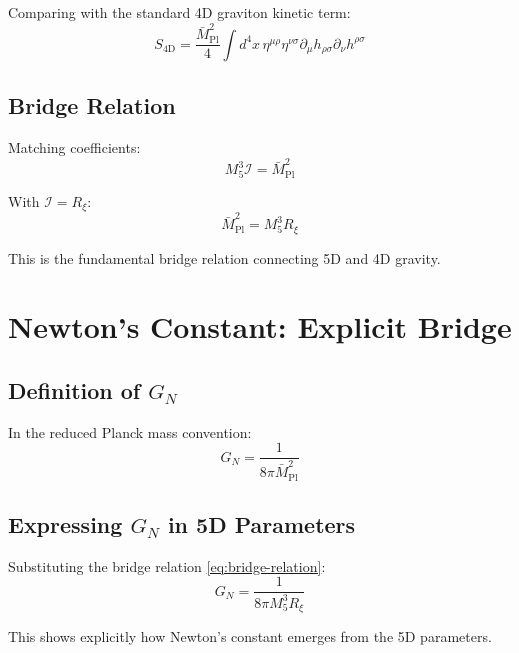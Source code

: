 \documentclass[11pt,a4paper]{article}
\newcommand{\Rxi}{R_\xi}
\newcommand{\Mplbar}{\bar{M}_{\mathrm{Pl}}}
\newcommand{\Mfive}{M_5}
\newcommand{\calI}{\mathcal{I}}
\newcommand{\GN}{G_N}
\begin{document}
Comparing with the standard 4D graviton kinetic term:
\begin{equation}
S_{\mathrm{4D}} = \frac{\Mplbar^2}{4} \int d^4x\, \eta^{\mu\rho}\eta^{\nu\sigma}
\partial_\mu h_{\rho\sigma} \partial_\nu h^{\rho\sigma}
\label{eq:4D-standard}
\end{equation}

\subsection{Bridge Relation}

Matching coefficients:
\begin{equation}
\Mfive^3 \calI = \Mplbar^2
\label{eq:bridge-intermediate}
\end{equation}

With $\calI = \Rxi$:
\begin{equation}
\boxed{\Mplbar^2 = \Mfive^3 \Rxi}
\label{eq:bridge-relation}
\end{equation}

This is the fundamental bridge relation connecting 5D and 4D gravity.

\section{Newton's Constant: Explicit Bridge}

\subsection{Definition of $\GN$}

In the reduced Planck mass convention:
\begin{equation}
\GN = \frac{1}{8\pi \Mplbar^2}
\label{eq:GN-def}
\end{equation}

\subsection{Expressing $\GN$ in 5D Parameters}

Substituting the bridge relation \eqref{eq:bridge-relation}:
\begin{equation}
\GN = \frac{1}{8\pi \Mfive^3 \Rxi}
\label{eq:GN-5D}
\end{equation}

This shows explicitly how Newton's constant emerges from the 5D parameters.
\end{document}
